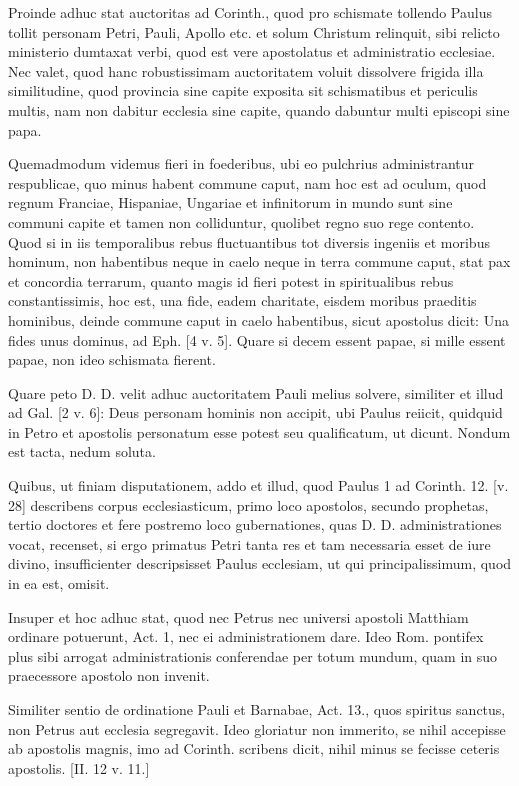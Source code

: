 Proinde adhuc stat auctoritas ad Corinth., quod pro schismate tollendo Paulus tollit personam Petri, Pauli, Apollo etc. et solum Christum relinquit, sibi relicto ministerio dumtaxat verbi, quod est vere apostolatus et administratio ecclesiae. Nec valet, quod hanc robustissimam auctoritatem voluit dissolvere frigida illa similitudine, quod provincia sine capite exposita sit schismatibus et periculis multis, nam non dabitur ecclesia sine capite, quando dabuntur multi episcopi sine papa.

Quemadmodum videmus fieri in foederibus, ubi eo pulchrius administrantur respublicae, quo minus habent commune caput, nam hoc est ad oculum, quod regnum Franciae, Hispaniae, Ungariae et infinitorum in mundo sunt sine communi capite et tamen non colliduntur, quolibet regno suo rege contento. Quod si in iis temporalibus rebus fluctuantibus tot diversis ingeniis et moribus hominum, non habentibus neque in caelo neque in terra commune caput, stat pax et concordia terrarum, quanto \marginpar{\small[314]} magis id fieri potest in spiritualibus rebus constantissimis, hoc est, una fide, eadem charitate, eisdem moribus praeditis hominibus, deinde commune caput in caelo habentibus, sicut apostolus dicit: Una fides unus dominus, ad Eph. [4 v. 5]. Quare si decem essent papae, si mille essent papae, non ideo schismata fierent.

Quare peto D. D. velit adhuc auctoritatem Pauli melius solvere, similiter et illud ad Gal. [2 v. 6]: Deus personam hominis non accipit, ubi Paulus reiicit, quidquid in Petro et apostolis personatum esse potest seu qualificatum, ut dicunt. Nondum est tacta, nedum soluta.

Quibus, ut finiam disputationem, addo et illud, quod Paulus 1 ad Corinth. 12. [v. 28] describens corpus ecclesiasticum, primo loco apostolos, secundo prophetas, tertio doctores et fere postremo loco gubernationes, quas D. D. administrationes vocat, recenset, si ergo primatus Petri tanta res et tam necessaria esset de iure divino, insufficienter descripsisset Paulus ecclesiam, ut qui principalissimum, quod in ea est, omisit.

Insuper et hoc adhuc stat, quod nec Petrus nec universi apostoli Matthiam ordinare potuerunt, Act. 1, nec ei administrationem dare. Ideo Rom. pontifex plus sibi arrogat administrationis conferendae per totum mundum, quam in suo praecessore apostolo non invenit.

Similiter sentio de ordinatione Pauli et Barnabae, Act. 13., quos spiritus sanctus, non Petrus aut ecclesia segregavit. Ideo gloriatur non immerito, se nihil accepisse ab apostolis magnis, imo ad Corinth. scribens dicit, nihil minus se fecisse ceteris apostolis. [II. 12 v. 11.]

